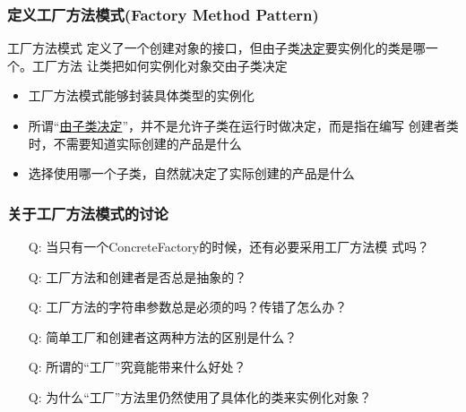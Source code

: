 \documentclass[compress]{beamer}
\begin{document}
\begin{frame}
  \frametitle{定义工厂方法模式(Factory Method Pattern)}

   {
  \begin{block}{工厂方法模式}
    定义了一个创建对象的接口，但由子类\uline{决定}要实例化的类是哪一个。工厂方法
    让类把如何实例化对象交由子类决定
  \end{block}

  \begin{itemize}
    \item 工厂方法模式能够封装具体类型的实例化
    \item 所谓``\uline{由子类决定}''，并不是允许子类在运行时做决定，而是指在编写
      创建者类时，不需要知道实际创建的产品是什么
    \item 选择使用哪一个子类，自然就决定了实际创建的产品是什么
  \end{itemize}
}

   {
  }

\end{frame}

\begin{frame}
  \frametitle{关于工厂方法模式的讨论}
  \begin{itemize}[<+-|alert@+>] 
    \item [Q:] 当只有一个ConcreteFactory的时候，还有必要采用工厂方法模
  式吗？
    \item [Q:] 工厂方法和创建者是否总是抽象的？
    \item [Q:] 工厂方法的字符串参数总是必须的吗？传错了怎么办？
    \item [Q:] 简单工厂和创建者这两种方法的区别是什么？
    \item [Q:] 所谓的``工厂''究竟能带来什么好处？
    \item [Q:] 为什么``工厂''方法里仍然使用了具体化的类来实例化对象？
  \end{itemize}
\end{frame}
\end{document}
